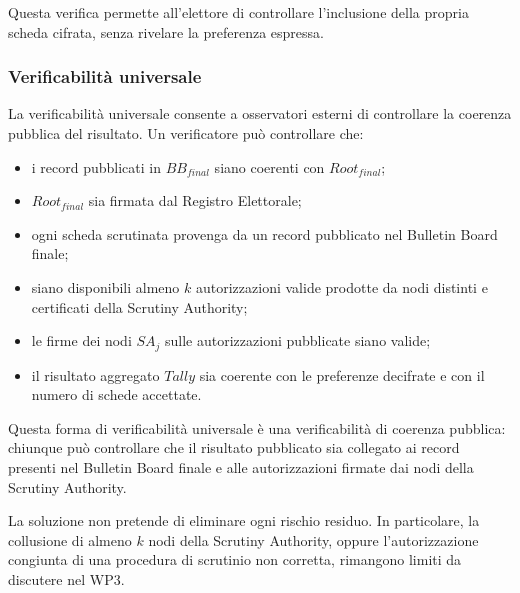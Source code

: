 \documentclass[a4paper,12pt]{article}
\begin{document}
Questa verifica permette all'elettore di controllare l'inclusione della propria scheda cifrata, senza rivelare la preferenza espressa.

\subsubsection{Verificabilit\`a universale}

La verificabilit\`a universale consente a osservatori esterni di controllare la coerenza pubblica del risultato.
Un verificatore pu\`o controllare che:

\begin{itemize}
	\item i record pubblicati in \(BB_{final}\) siano coerenti con \(Root_{final}\);
	\item \(Root_{final}\) sia firmata dal Registro Elettorale;
	\item ogni scheda scrutinata provenga da un record pubblicato nel Bulletin Board finale;
	\item siano disponibili almeno \(k\) autorizzazioni valide prodotte da nodi distinti e certificati della Scrutiny Authority;
    \item le firme dei nodi \(SA_j\) sulle autorizzazioni pubblicate siano valide;
	\item il risultato aggregato \(Tally\) sia coerente con le preferenze decifrate e con il numero di schede accettate.
\end{itemize}

Questa forma di verificabilit\`a universale \`e una verificabilit\`a di coerenza pubblica: chiunque pu\`o controllare che il risultato pubblicato sia collegato ai record presenti nel Bulletin Board finale e alle autorizzazioni firmate dai nodi della Scrutiny Authority.

La soluzione non pretende di eliminare ogni rischio residuo.
In particolare, la collusione di almeno \(k\) nodi della Scrutiny Authority, oppure l'autorizzazione congiunta di una procedura di scrutinio non corretta, rimangono limiti da discutere nel WP3.
\end{document}
